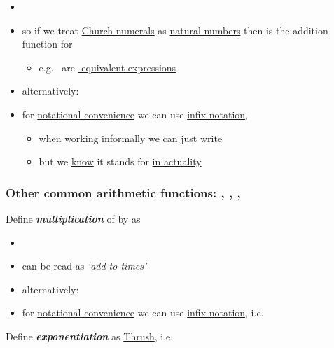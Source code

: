 \begin{itemize}
\tightlist
\item
\item
  so if we treat \ul{Church numerals} as \ul{natural numbers} then
  \iMbox{(+)} is the addition function for 

  \begin{itemize}
  \tightlist
  \item
    e.g.~ are
    \ul{\iMbox{\beta}-equivalent expressions}
  \end{itemize}
\item
  alternatively: 
\item
  for \ul{notational convenience} we can use \ul{infix notation},

  \begin{itemize}
  \tightlist
  \item
    when working informally we can just write 
  \item
    but we \ul{know} it stands for  \ul{in actuality}
  \end{itemize}
\end{itemize}

\subsubsection*{\texorpdfstring{Other common arithmetic functions:
\iMbox{(\times)}, , ,
\iMbox{(-)}}{Other common arithmetic functions: , , , }}

Define \textbf{\textit{multiplication}} of  by  as

\begin{itemize}
\tightlist
\item
\item
  can be read as \textit{`add  to   times'}
\item
  alternatively: 
\item
  for \ul{notational convenience} we can use \ul{infix notation},
  i.e.~
\end{itemize}

Define \textbf{\textit{exponentiation}}  as
\ul{Thrush},
i.e.~

